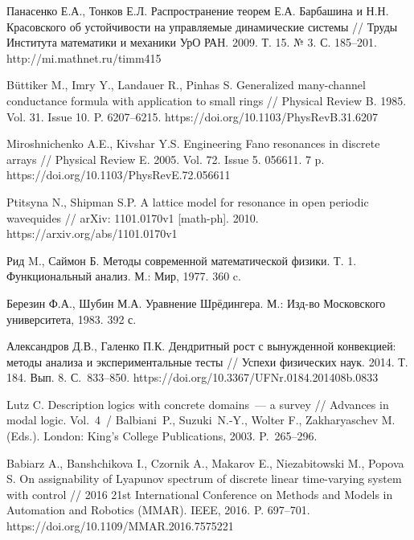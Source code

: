 \documentclass[12pt,a4paper,twoside]{article}  %
\begin{document}
{\begin{thebibliography}{99}
 Панасенко Е.А., Тонков Е.Л. Распространение теорем Е.А. Барбашина и Н.Н. Красовского об устойчивости на управляемые динамические системы // Труды Института математики и механики УрО РАН. 2009. Т. 15. № 3. С. 185--201.
http://mi.mathnet.ru/timm415

 B\"uttiker M., Imry Y., Landauer R., Pinhas S. Generalized many-channel conductance formula with application to small rings // Physical Review B. 1985. Vol. 31. Issue 10. P. 6207--6215.
https://doi.org/10.1103/PhysRevB.31.6207

 Miroshnichenko A.E., Kivshar Y.S. Engineering Fano resonances in discrete arrays // Physical Review E. 2005. Vol. 72. Issue 5. 056611. 7 p.
https://doi.org/10.1103/PhysRevE.72.056611

 Ptitsyna N., Shipman S.P. A lattice model for resonance in open periodic wavequides // arXiv: 1101.0170v1 [math-ph]. 2010.
https://arxiv.org/abs/1101.0170v1

 Рид M., Саймон Б. Методы современной математической физики. Т. 1. Функциональный анализ. М.: Мир, 1977. 360 c.

 Березин Ф.А., Шубин М.А. Уравнение Шрёдингера. М.: Изд-во Московского университета, 1983. 392 с.


 Александров Д.В., Галенко П.К. Дендритный рост с вынужденной конвекцией: методы анализа и экспериментальные тесты // Успехи физических наук. 2014. Т. 184. Вып. 8. С.~833--850.
https://doi.org/10.3367/UFNr.0184.201408b.0833


Lutz C. Description logics with concrete domains~--- a survey //
Advances in modal logic. Vol.~4~/
Balbiani~P., Suzuki~N.-Y., Wolter F., Zakharyaschev M. (Eds.).
London: King's College Publications, 2003.
P.~265--296.


Babiarz A., Banshchikova I., Czornik A., Makarov E., Niezabitowski M., Popova S. On assignability
of Lyapunov spectrum of discrete linear time-varying system with control // 2016 21st International
Conference on Methods and Models in Automation and Robotics (MMAR). IEEE, 2016. P. 697--701.
https://doi.org/10.1109/MMAR.2016.7575221

\end{thebibliography}}
\end{document}
